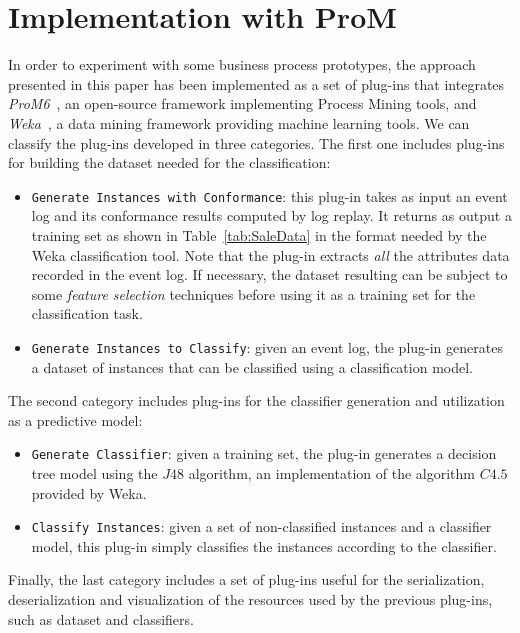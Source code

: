 \documentclass{llncs}
\begin{document}
\section{Implementation with ProM}\label{implementation}
In order to experiment with some business process prototypes, the approach presented in this paper has been implemented as a set of plug-ins that integrates \emph{ProM6}~\cite{DBLP:conf/bpm/AalstDGRVW09}, an open-source framework implementing Process Mining tools, and \emph{Weka}~\cite{DBLP:journals/sigkdd/HallFHPRW09}, a data mining framework providing machine learning tools.
We can classify the plug-ins developed in three categories. The first one includes plug-ins for building the dataset needed for the classification:
\begin{itemize}
\item \texttt{Generate Instances with Conformance}: this plug-in takes as input an event log and its conformance results computed by log replay. It returns as output a training set as shown in Table~\ref{tab:SaleData} in the format needed by the Weka classification tool. Note that the plug-in extracts \emph{all} the attributes data recorded in the event log. If necessary, the dataset resulting can be subject to some \emph{feature selection} techniques before using it as a training set for the classification task.  

\item \texttt{Generate Instances to Classify}: given an event log, the plug-in generates a dataset of instances that can be classified using a classification model.
\end{itemize}
The second category includes plug-ins for the classifier generation and utilization as a predictive model:
\begin{itemize}
\item \texttt{Generate Classifier}: given a training set, the plug-in generates a decision tree model using the $J48$ algorithm, an implementation of the algorithm $C4.5$ provided by Weka.
\item \texttt{Classify Instances}: given a set of non-classified instances and a classifier model, this plug-in simply classifies the instances according to the classifier.
\end{itemize}
Finally, the last category includes a set of plug-ins useful for the serialization, deserialization and visualization of the resources used by the previous plug-ins, such as dataset and classifiers. 
\end{document}

